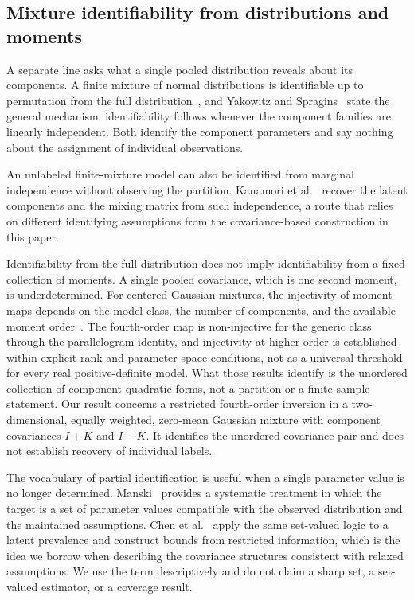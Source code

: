 \subsection{Mixture identifiability from distributions and
moments}\label{mixture-identifiability-from-distributions-and-moments}

A separate line asks what a single pooled distribution reveals about its
components. A finite mixture of normal distributions is identifiable up
to permutation from the full
distribution~\cite{teicher1963}, and Yakowitz and
Spragins~\cite{yakowitz1968} state the general
mechanism: identifiability follows whenever the component families are
linearly independent. Both identify the component parameters and say
nothing about the assignment of individual observations.

An unlabeled finite-mixture model can also be identified from marginal
independence without observing the partition. Kanamori et
al.~\cite{kanamori2026} recover the latent components
and the mixing matrix from such independence, a route that relies on
different identifying assumptions from the covariance-based construction
in this paper.

Identifiability from the full distribution does not imply
identifiability from a fixed collection of moments. A single pooled
covariance, which is one second moment, is underdetermined. For centered
Gaussian mixtures, the injectivity of moment maps depends on the model
class, the number of components, and the available moment
order~\cite{blomenhofer2023}. The fourth-order map is
non-injective for the generic class through the parallelogram identity,
and injectivity at higher order is established within explicit rank and
parameter-space conditions, not as a universal threshold for every real
positive-definite model. What those results identify is the unordered
collection of component quadratic forms, not a partition or a
finite-sample statement. Our result concerns a restricted fourth-order
inversion in a two-dimensional, equally weighted, zero-mean Gaussian
mixture with component covariances \(I+K\) and \(I-K\). It identifies
the unordered covariance pair and does not establish recovery of
individual labels.

The vocabulary of partial identification is useful when a single
parameter value is no longer determined.
Manski~\cite{manski2003} provides a systematic treatment
in which the target is a set of parameter values compatible with the
observed distribution and the maintained assumptions. Chen et
al.~\cite{chen2026} apply the same set-valued logic to a
latent prevalence and construct bounds from restricted information,
which is the idea we borrow when describing the covariance structures
consistent with relaxed assumptions. We use the term descriptively and
do not claim a sharp set, a set-valued estimator, or a coverage result.

